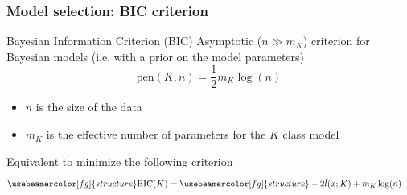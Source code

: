 \documentclass[compress, smaller, serif, 9pt]{beamer}
\newcommand{\structuretext}[1]{{\usebeamercolor[fg]{structure} #1}}
\begin{document}
\begin{frame}
   \frametitle{Model selection: BIC criterion}

  \begin{block}{Bayesian Information Criterion (BIC)}
   Asymptotic ($n \gg m_K$)  criterion for Bayesian models (i.e. with a prior on the model parameters)
   $$ \textrm{pen}(K,n)=\frac{1}{2} m_K \log(n)$$
   
   \begin{itemize}
    \item $n$ is the size of the data
    \item $m_K$ is the effective number of parameters for the $K$ class model
    \end{itemize}
   Equivalent to minimize the following criterion
   \begin{align*}
    \structuretext{\textrm{BIC}(K)} & = \structuretext{-2 \hat{l}(x ; K) + m_K \log(n) } 
    \end{align*}
   \end{block}


\end{frame}
\end{document}
